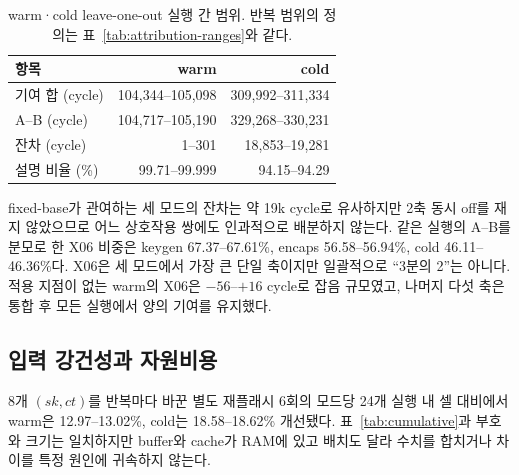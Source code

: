 \documentclass[runningheads,orivec]{llncs}
\begin{document}
\begin{table}[H]\centering\footnotesize
\caption{warm·cold leave-one-out 실행 간 범위. 반복 범위의 정의는
표~\ref{tab:attribution-ranges}와 같다.}
\label{tab:attribution-ranges-decaps}
\renewcommand{\arraystretch}{1.05}
\begin{tabular}{lrr}\toprule
항목 & warm & cold\\\midrule
기여 합 (cycle) & 104,344--105,098 & 309,992--311,334\\
A--B (cycle) & 104,717--105,190 & 329,268--330,231\\
잔차 (cycle) & 1--301 & 18,853--19,281\\
설명 비율 (\%) & 99.71--99.999 & 94.15--94.29\\\bottomrule
\end{tabular}
\end{table}

fixed-base가 관여하는 세 모드의 잔차는 약 19k cycle로 유사하지만 2축 동시 off를
재지 않았으므로 어느 상호작용 쌍에도 인과적으로 배분하지 않는다. 같은 실행의 A--B를
분모로 한 X06 비중은 keygen 67.37--67.61\%, encaps 56.58--56.94\%, cold
46.11--46.36\%다. X06은 세 모드에서 가장 큰 단일 축이지만 일괄적으로 ``3분의 2''는
아니다. 적용 지점이 없는 warm의 X06은 $-56$--$+16$ cycle로 잡음 규모였고, 나머지
다섯 축은 통합 후 모든 실행에서 양의 기여를 유지했다.

\subsection{입력 강건성과 자원비용}\label{sec:resources}

8개 $(sk,ct)$를 반복마다 바꾼 별도 재플래시 6회의 모드당 24개 실행 내 셀 대비에서 warm은
12.97--13.02\%, cold는 18.58--18.62\% 개선됐다. 표~\ref{tab:cumulative}과 부호와
크기는 일치하지만 buffer와 cache가 RAM에 있고 배치도 달라 수치를 합치거나 차이를
특정 원인에 귀속하지 않는다.
\end{document}

